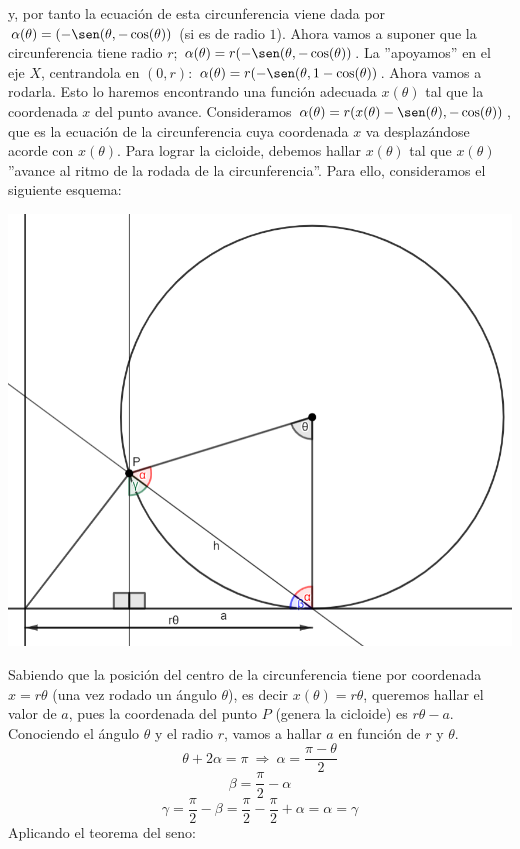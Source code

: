 \documentclass{article}
\begin{document}
y, por tanto la ecuación de esta circunferencia viene dada por $\alpha(\theta)=(-\sen(\theta,-\cos(\theta))$ (si es de radio $1$).
Ahora vamos a suponer que la circunferencia tiene radio $r$; $\alpha(\theta)=r(-\sen(\theta,-\cos(\theta))$.
La ''apoyamos'' en el eje $X$, centrandola en $(0,r)$: $\alpha(\theta)=r(-\sen(\theta,1-\cos(\theta))$.
Ahora vamos a rodarla. Esto lo haremos encontrando una función adecuada $x(\theta)$ tal que la coordenada $x$  del punto avance.
Consideramos $\alpha(\theta)=r(x(\theta)-\sen(\theta),-\cos(\theta))$, que es la ecuación de la circunferencia cuya coordenada
$x$ va desplazándose acorde con $x(\theta)$. Para lograr la cicloide, debemos hallar $x(\theta)$ tal que $x(\theta)$
''avance al ritmo de la rodada de la circunferencia''. Para ello, consideramos el siguiente esquema:
\begin{center}
    \includegraphics[scale=0.3]{figuras/esquema.PNG}
\end{center}
Sabiendo que la posición del centro de la circunferencia tiene por coordenada $x=r\theta$ (una vez rodado un ángulo $\theta$),
es decir $x(\theta)=r\theta$,
queremos hallar el valor de $a$, pues la coordenada del punto $P$ (genera la cicloide) es $r\theta-a$.
Conociendo el ángulo $\theta$ y el radio $r$, vamos a hallar $a$ en función de $r$ y $\theta$.
$$
\theta + 2\alpha = \pi \: \Rightarrow \: \alpha=\frac{\pi-\theta}{2}
$$
$$
\beta = \frac{\pi}{2}-\alpha
$$
$$
\gamma=\frac{\pi}{2}-\beta=\frac{\pi}{2}-\frac{\pi}{2}+\alpha=\alpha=\gamma
$$
Aplicando el teorema del seno:
\end{document}
